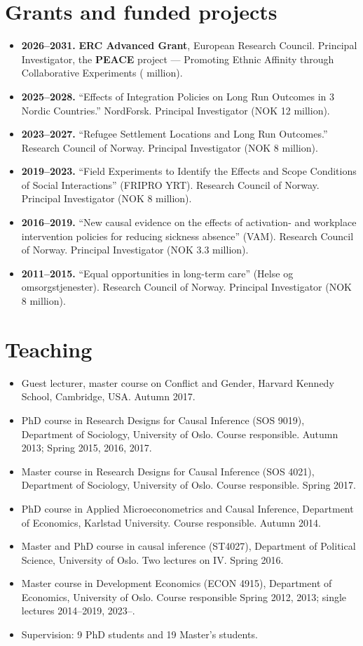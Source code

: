 \documentclass[11pt]{article}
\begin{document}
\section{Grants and funded projects}
\begin{itemize}
  \item \textbf{2026--2031.} \textbf{ERC Advanced Grant}, European Research Council. Principal Investigator, the \textbf{PEACE} project --- Promoting Ethnic Affinity through Collaborative Experiments ( million).
  \item \textbf{2025--2028.} ``Effects of Integration Policies on Long Run Outcomes in 3 Nordic Countries.'' NordForsk. Principal Investigator (NOK 12 million).
  \item \textbf{2023--2027.} ``Refugee Settlement Locations and Long Run Outcomes.'' Research Council of Norway. Principal Investigator (NOK 8 million).
  \item \textbf{2019--2023.} ``Field Experiments to Identify the Effects and Scope Conditions of Social Interactions'' (FRIPRO YRT). Research Council of Norway. Principal Investigator (NOK 8 million).
  \item \textbf{2016--2019.} ``New causal evidence on the effects of activation- and workplace intervention policies for reducing sickness absence'' (VAM). Research Council of Norway. Principal Investigator (NOK 3.3 million).
  \item \textbf{2011--2015.} ``Equal opportunities in long-term care'' (Helse og omsorgstjenester). Research Council of Norway. Principal Investigator (NOK 8 million).
\end{itemize}

\section{Teaching}
\begin{itemize}
  \item Guest lecturer, master course on Conflict and Gender, Harvard Kennedy School, Cambridge, USA. Autumn 2017.
  \item PhD course in Research Designs for Causal Inference (SOS 9019), Department of Sociology, University of Oslo. Course responsible. Autumn 2013; Spring 2015, 2016, 2017.
  \item Master course in Research Designs for Causal Inference (SOS 4021), Department of Sociology, University of Oslo. Course responsible. Spring 2017.
  \item PhD course in Applied Microeconometrics and Causal Inference, Department of Economics, Karlstad University. Course responsible. Autumn 2014.
  \item Master and PhD course in causal inference (ST4027), Department of Political Science, University of Oslo. Two lectures on IV. Spring 2016.
  \item Master course in Development Economics (ECON 4915), Department of Economics, University of Oslo. Course responsible Spring 2012, 2013; single lectures 2014--2019, 2023--.
  \item Supervision: 9 PhD students and 19 Master's students.
\end{itemize}
\end{document}
